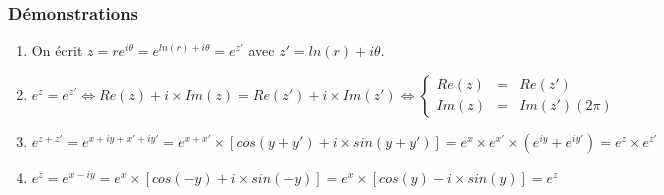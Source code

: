 \documentclass[a4paper,10pt]{book}
\begin{document}
\subsubsection{Démonstrations}
\begin{enumerate}
\item On écrit $z=re^{i\theta} =e^{ln(r)+i\theta}=e^{z'}$ avec $z'=ln(r)+i\theta$.
\item $e^{z}=e^{z'} \Leftrightarrow Re(z)+i\times Im(z)=Re(z')+i\times Im(z') \Leftrightarrow \left \{ \begin{array}{rcl} Re(z)&=&Re(z')\\
Im(z)&=&Im(z') (2\pi) \end{array} \right .$\\
\item $e^{z+z'}=e^{x+iy+x'+iy'}=e^{x+x'}\times [cos(y+y')+i\times sin(y+y')]=e^{x}\times e^{x'} \times (e^{iy}+e^{iy'})=e^{z}\times e^{z'}$
\item $e^{\overline{z}}=e^{x-iy}=e^{x}\times [cos(-y)+i\times sin(-y)]=e^{x}\times [cos(y)-i\times sin(y)]=e^{z}$\\\\
\end{enumerate}
\end{document}
